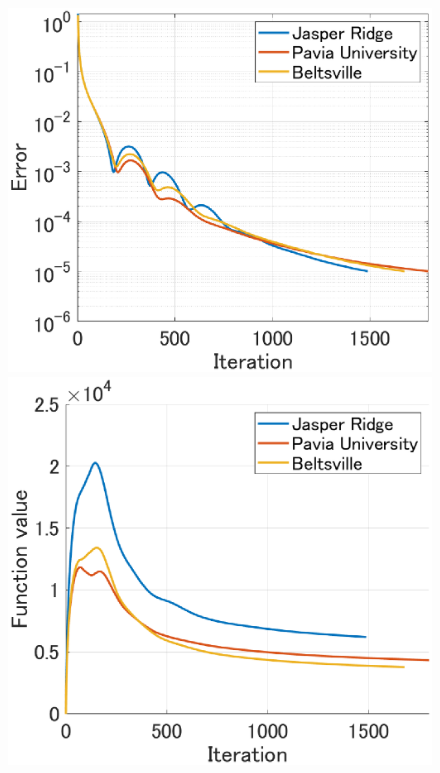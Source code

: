 \begin{figure}[t]
    \begin{center}
        \begin{minipage}{0.240\hsize}
            \centerline{\includegraphics[width=\hsize]{./fig_Conv_Anal/error.eps}}
        \end{minipage}
        \begin{minipage}{0.240\hsize}
            \centerline{\includegraphics[width=\hsize]{./fig_Conv_Anal/function_value.eps}}

\end{minipage}
\end{center}
\end{figure}

